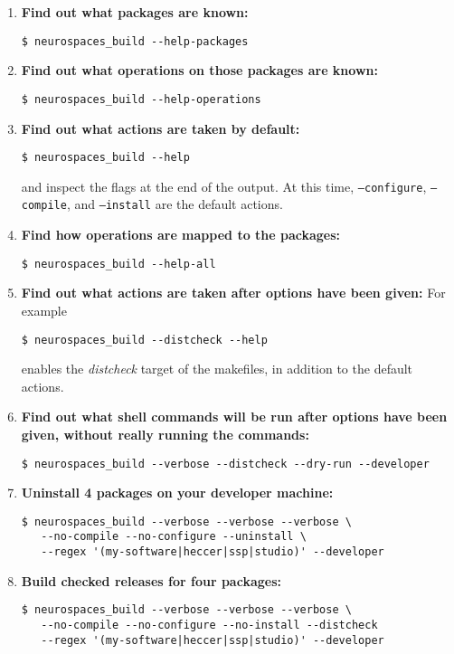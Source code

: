 \documentclass[12pt]{article}
\begin{document}
\begin{enumerate}
\item {\bf Find out what packages are known:}
\begin{verbatim}
$ neurospaces_build --help-packages
\end{verbatim}

\item {\bf Find out what operations on those packages are known:}
\begin{verbatim}
$ neurospaces_build --help-operations
\end{verbatim}

\item {\bf Find out what actions are taken by default:}
\begin{verbatim}
$ neurospaces_build --help
\end{verbatim}
and inspect the flags at the end of the output. At this time, {\tt --configure}, {\tt --compile}, and {\tt --install} are the default actions. 

\item {\bf Find how operations are mapped to the packages:}
\begin{verbatim}
$ neurospaces_build --help-all
\end{verbatim}

\item {\bf Find out what actions are taken after options have been given:} For example
\begin{verbatim}
$ neurospaces_build --distcheck --help
\end{verbatim}
enables the {\it distcheck} target of the makefiles, in addition to the default actions. 

\item {\bf Find out what shell commands will be run after options have been given, without really running the commands:}
\begin{verbatim}
$ neurospaces_build --verbose --distcheck --dry-run --developer
\end{verbatim}

\item {\bf Uninstall 4 packages on your developer machine:}
\begin{verbatim}
$ neurospaces_build --verbose --verbose --verbose \
   --no-compile --no-configure --uninstall \
   --regex '(my-software|heccer|ssp|studio)' --developer
\end{verbatim}

\item {\bf Build checked releases for four packages:}
\begin{verbatim}
$ neurospaces_build --verbose --verbose --verbose \
   --no-compile --no-configure --no-install --distcheck 
   --regex '(my-software|heccer|ssp|studio)' --developer
\end{verbatim}


\end{enumerate}
\end{document}

